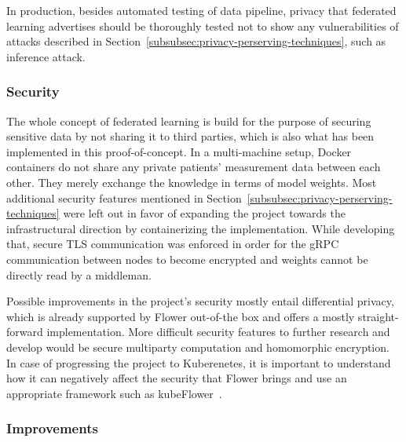 
In production, besides automated testing of data pipeline, privacy that federated learning advertises should be thoroughly tested not to show any vulnerabilities of attacks described in Section~\ref{subsubsec:privacy-perserving-techniques}, such as inference attack.

\subsubsection{Security}


The whole concept of federated learning is build for the purpose of securing sensitive data by not sharing it to third parties, which is also what has been implemented in this proof-of-concept. In a multi-machine setup, Docker containers do not share any private patients' measurement data between each other. They merely exchange the knowledge in terms of model weights. Most additional security features mentioned in Section~\ref{subsubsec:privacy-perserving-techniques} were left out in favor of expanding the project towards the infrastructural direction by containerizing the implementation. While developing that, secure TLS communication was enforced in order for the gRPC communication between nodes to become encrypted and weights cannot be directly read by a middleman.


Possible improvements in the project's security mostly entail differential privacy, which is already supported by Flower out-of-the box and offers a mostly straight-forward implementation. More difficult security features to further research and develop would be secure multiparty computation and homomorphic encryption. In case of progressing the project to Kuberenetes, it is important to understand how it can negatively affect the security that Flower brings and use an appropriate framework such as kubeFlower~\cite{parra-ullauriKubeFlowerPrivacypreservingFramework2024}.


\subsubsection{Improvements}

